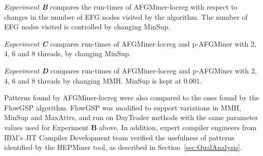 \emph{Experiment {\bf B}} compares the run-times of AFGMiner-locreg with respect to changes in the number of EFG nodes visited by the algorithm. The number of EFG nodes visited is controlled by changing MinSup.

\emph{Experiment {\bf C}} compares run-times of AFGMiner-locreg and p-AFGMiner with 2, 4, 6 and 8 threads, by changing MinSup.

\emph{Experiment {\bf D}} compares run-times of AFGMiner-locreg and p-AFGMiner with 2, 4, 6 and 8 threads by changing MMH. MinSup is kept at 0.001.

Patterns found by AFGMiner-locreg were also compared to the ones found by the FlowGSP algorithm. FlowGSP was modified to support variations in MMH, MinSup and MaxAttrs, and run on DayTrader methods with the same parameter values used for Experiment {\bf B} above. In addition, expert compiler engineers from IBM's JIT Compiler Development team verified the usefulness of patterns identified by the HEPMiner tool, as described in Section~\ref{sec:QualAnalysis}.







